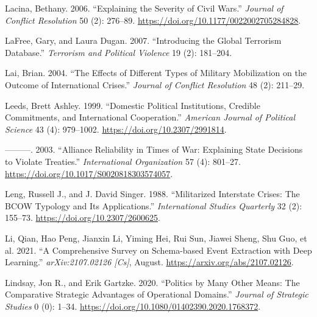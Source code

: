 \documentclass{article}
\newlength{\cslhangindent}
\newlength{\cslentryspacingunit} %
\newenvironment{CSLReferences}[2] %
 {%
  \setlength{\parindent}{0pt}
  \ifodd #1
  \let\oldpar\par
  \def\par{\hangindent=\cslhangindent\oldpar}
  \fi
  \setlength{\parskip}{#2\cslentryspacingunit}
 }%
 {}
\begin{document}
\begin{CSLReferences}{1}{0}
\leavevmode{}%
Lacina, Bethany. 2006. {``Explaining the {Severity} of {Civil Wars}.''}
\emph{Journal of Conflict Resolution} 50 (2): 276--89.
\url{https://doi.org/10.1177/0022002705284828}.

\leavevmode{}%
LaFree, Gary, and Laura Dugan. 2007. {``Introducing the Global Terrorism
Database.''} \emph{Terrorism and Political Violence} 19 (2): 181--204.

\leavevmode{}%
Lai, Brian. 2004. {``The Effects of Different Types of Military
Mobilization on the Outcome of International Crises.''} \emph{Journal of
Conflict Resolution} 48 (2): 211--29.

\leavevmode{}%
Leeds, Brett Ashley. 1999. {``Domestic {Political Institutions},
{Credible Commitments}, and {International Cooperation}.''}
\emph{American Journal of Political Science} 43 (4): 979--1002.
\url{https://doi.org/10.2307/2991814}.

\leavevmode{}%
---------. 2003. {``Alliance {Reliability} in {Times} of {War}:
{Explaining State Decisions} to {Violate Treaties}.''}
\emph{International Organization} 57 (4): 801--27.
\url{https://doi.org/10.1017/S0020818303574057}.

\leavevmode{}%
Leng, Russell J., and J. David Singer. 1988. {``Militarized {Interstate
Crises}: {The BCOW Typology} and {Its Applications}.''}
\emph{International Studies Quarterly} 32 (2): 155--73.
\url{https://doi.org/10.2307/2600625}.

\leavevmode{}%
Li, Qian, Hao Peng, Jianxin Li, Yiming Hei, Rui Sun, Jiawei Sheng, Shu
Guo, et al. 2021. {``A {Comprehensive Survey} on {Schema-based Event
Extraction} with {Deep Learning}.''} \emph{arXiv:2107.02126 {[}Cs{]}},
August. \url{https://arxiv.org/abs/2107.02126}.

\leavevmode{}%
Lindsay, Jon R., and Erik Gartzke. 2020. {``Politics by Many Other
Means: {The} Comparative Strategic Advantages of Operational Domains.''}
\emph{Journal of Strategic Studies} 0 (0): 1--34.
\url{https://doi.org/10.1080/01402390.2020.1768372}.


\end{CSLReferences}
\end{document}
